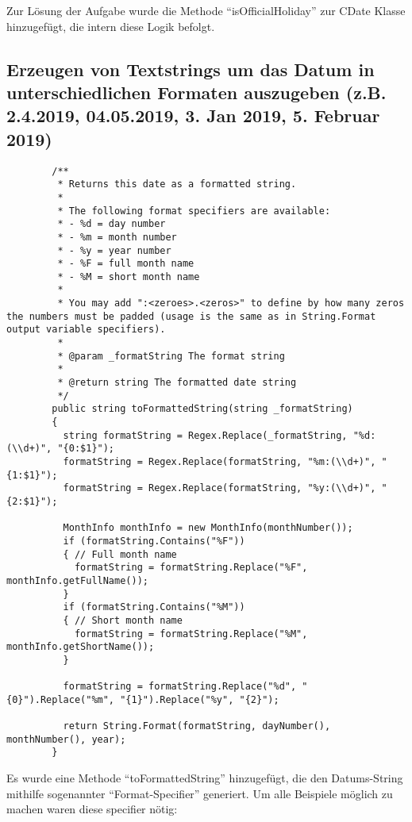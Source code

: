 \documentclass[12pt,pdftex,parskip=half]{scrartcl}
\begin{document}
    Zur Lösung der Aufgabe wurde die Methode "`isOfficialHoliday"' zur CDate Klasse hinzugefügt, die intern diese Logik befolgt.

    \clearpage


    \subsection{Erzeugen von Textstrings um das Datum in unterschiedlichen Formaten auszugeben (z.B. 2.4.2019, 04.05.2019, 3. Jan 2019, 5. Februar 2019)}

    \begin{lstlisting}
        /**
         * Returns this date as a formatted string.
         *
         * The following format specifiers are available:
         * - %d = day number
         * - %m = month number
         * - %y = year number
         * - %F = full month name
         * - %M = short month name
         *
         * You may add ":<zeroes>.<zeros>" to define by how many zeros the numbers must be padded (usage is the same as in String.Format output variable specifiers).
         *
         * @param _formatString The format string
         *
         * @return string The formatted date string
         */
        public string toFormattedString(string _formatString)
        {
          string formatString = Regex.Replace(_formatString, "%d:(\\d+)", "{0:$1}");
          formatString = Regex.Replace(formatString, "%m:(\\d+)", "{1:$1}");
          formatString = Regex.Replace(formatString, "%y:(\\d+)", "{2:$1}");

          MonthInfo monthInfo = new MonthInfo(monthNumber());
          if (formatString.Contains("%F"))
          { // Full month name
            formatString = formatString.Replace("%F", monthInfo.getFullName());
          }
          if (formatString.Contains("%M"))
          { // Short month name
            formatString = formatString.Replace("%M", monthInfo.getShortName());
          }

          formatString = formatString.Replace("%d", "{0}").Replace("%m", "{1}").Replace("%y", "{2}");

          return String.Format(formatString, dayNumber(), monthNumber(), year);
        }
    \end{lstlisting}

    \clearpage

    Es wurde eine Methode "`toFormattedString"' hinzugefügt, die den Datums-String mithilfe sogenannter "`Format-Specifier"' generiert.
    Um alle Beispiele möglich zu machen waren diese specifier nötig:
\end{document}

